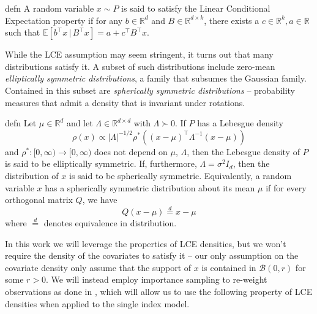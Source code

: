 \documentclass[11pt]{article}
\begin{document}
\begin{restatable}{defn}{} \label{def: lce}
    A random variable $x \sim P$ is said to satisfy the Linear Conditional Expectation property if for any $b \in \mathbb{R}^{d}$ and $B \in \mathbb{R}^{d\times k}$, there exists a $c\in \mathbb{R}^k, a \in \mathbb{R}$ such that $\mathbb{E}[b^{\top}x \,| \,B^{\top}x ] = a +c^{\top}B^{\top}x.$
\end{restatable}

While the LCE assumption may seem stringent, it turns out that many distributions satisfy it. A subset of such distributions include zero-mean \textit{elliptically symmetric distributions}, a family that subsumes the Gaussian family. Contained in this subset are \textit{spherically symmetric distributions} -- probability measures that admit a density that is invariant under rotations.

\begin{restatable}{defn}{}\label{def: spherical symmetry}
Let $\mu \in \mathbb{R}^d$ and let $\Lambda \in \mathbb{R}^{d\times d}$ with $\Lambda \succ 0$. If $P$ has a Lebesgue density
\begin{equation}
     \rho(x) \propto |\Lambda|^{-1/2}\rho^*\left((x-\mu)^{\top}\Lambda^{-1}(x - \mu)\right)
\end{equation}
and $\rho^*:[0, \infty) \rightarrow[0, \infty)$ does not depend on $\mu$, $\Lambda$, then the Lebesgue density of $P$ is said to be elliptically symmetric. If, furthermore, $\Lambda = \sigma^2I_d$, then the distribution of $x$ is said to be spherically symmetric. Equivalently, a random variable $x$ has a spherically symmetric distribution about its mean $\mu$ if for every orthogonal matrix $Q$, we have \[Q(x - \mu) \overset{d}{=} x - \mu\] where $\overset{d}{=}$ denotes equivalence in distribution. 
\end{restatable}



In this work we will leverage the properties of LCE densities, but we won't require the density of the covariates to satisfy it -- our only assumption on the covariate density only assume that the support of $x$ is contained in $\mathcal{B}(0, r)$ for some $r > 0$. We will instead employ importance sampling to re-weight observations as done in \citet{Newey_Ruud_2005}, which will allow us to use the following property of LCE densities when applied to the single index model.
\end{document}
